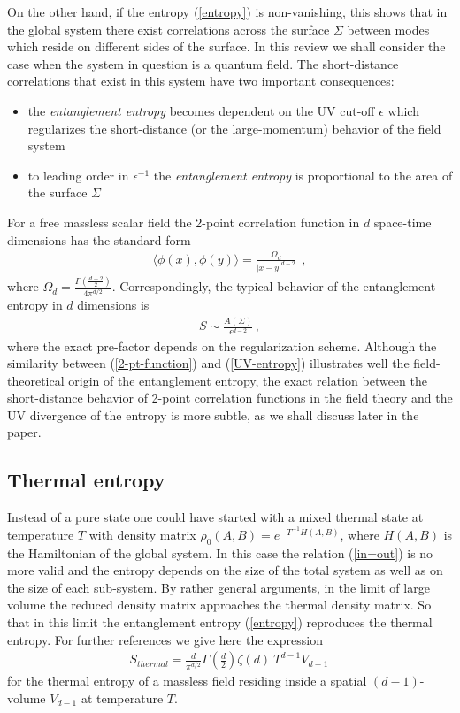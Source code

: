 \documentclass[12pt]{article}
\def\be{\begin{eqnarray}}
\def\ee{\end{eqnarray}}
\def\lb{\label}
\begin{document}
On the other hand, if  the entropy (\ref{entropy}) is non-vanishing, this shows that in the global system there exist correlations  across the surface $\Sigma$ between modes which reside on different sides of the surface. In this review we shall consider the case when the system in question is a quantum field. 
The short-distance correlations that exist in this system  have two important consequences:
\begin{itemize}
\item the \emph{entanglement entropy} becomes dependent on the UV cut-off $\epsilon$ which regularizes the short-distance (or the large-momentum) 
behavior of the field system
\item  to leading order in ${\epsilon}^{-1}$ the \emph{entanglement entropy} is proportional to the area of the surface $\Sigma$
\end{itemize}
For a free massless scalar field the 2-point correlation function in $d$ space-time dimensions has the standard form 
\be
\langle\phi(x),\phi(y)\rangle=\frac{\Omega_d}{ |x-y|^{d-2}}~~,
\lb{2-pt-function}
\ee
where $\Omega_d=\frac{\Gamma (\frac{d-2}{2})}{ 4\pi^{d/ 2}}$. Correspondingly, the typical behavior of the entanglement entropy in $d$ dimensions is
\be
S\sim \frac{A(\Sigma)}{ \epsilon^{d-2}}\, ,
\lb{UV-entropy}
\ee
where the exact pre-factor depends on the regularization scheme. Although the  similarity between (\ref{2-pt-function}) and (\ref{UV-entropy}) illustrates well the field-theoretical origin of the entanglement entropy, the exact relation between the short-distance behavior of  2-point correlation functions in the field theory and the UV divergence of the entropy is more subtle, as we shall discuss later in the paper. 

\subsection{Thermal entropy}
Instead of a pure state one could have started with a mixed thermal state at temperature $T$ with density matrix $\rho_0(A,B)=e^{-T^{-1}H(A,B)}$, where $H(A,B)$ is the Hamiltonian of the global system. In this case  the relation
(\ref{in=out}) is no more valid and the entropy depends on the size of the total system as well as on the size of each  sub-system. By rather general arguments,  in the limit of large volume  the reduced density matrix approaches the thermal density matrix. So that  in this limit the entanglement entropy (\ref{entropy})  reproduces the thermal entropy.  For  further references we give here the expression 
\be
S_{thermal}=\frac{d}{\pi^{d/2}}\Gamma (\frac{d}{2})\zeta(d)\ T^{d-1}V_{d-1}\, 
\lb{Sthermal}
\ee
for the thermal entropy of a massless field residing inside  a spatial $(d-1)$-volume $V_{d-1}$ at temperature $T$.
\end{document}
